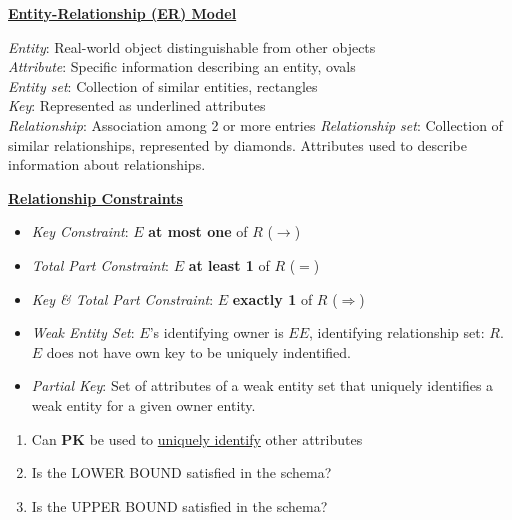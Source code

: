 \documentclass[10pt,landscape]{article}
\begin{document}
\begin{multicols*}{3}
\textbf{\underline{Entity-Relationship (ER) Model}}
\begin{scriptsize}
    \textit{Entity}: Real-world object distinguishable from other objects \\
    \textit{Attribute}: Specific information describing an entity, ovals \\
    \textit{Entity set}: Collection of similar entities, rectangles \\
    \textit{Key}: Represented as underlined attributes \\
    \textit{Relationship}: Association among 2 or more entries
    \textit{Relationship set}: Collection of similar relationships, represented by diamonds. Attributes used to describe information about relationships.
\end{scriptsize}

\textbf{\underline{Relationship Constraints}}
\begin{multicols*}{2}
    \begin{itemize}[topsep=0pt,noitemsep,wide=0pt, leftmargin=\dimexpr{} + 2\relax]
        \item \textit{Key Constraint}: $E$ \textbf{at most one} of $R$ ($\rightarrow$)
        \item \textit{Total Part Constraint}: $E$ \textbf{at least 1} of $R$ ($=$)
        \item \textit{Key \& Total Part Constraint}: $E$ \textbf{exactly 1} of $R$ ($\Rightarrow$)\\
        \item \textit{Weak Entity Set}: $E$'s identifying owner is $EE$, identifying relationship set: $R$. $E$ does not have own key to be uniquely indentified.
        \item \textit{Partial Key}: Set of attributes of a weak entity set that uniquely identifies a weak entity for a given owner entity.
    \end{itemize}
\end{multicols*}
\begin{enumerate}[topsep=0pt,noitemsep,wide=0pt, leftmargin=\dimexpr\labelwidth + 2\labelsep\relax]
    \item Can \textbf{PK} be used to \underline{uniquely identify} other attributes
    \item Is the LOWER BOUND satisfied in the schema?
    \item Is the UPPER BOUND satisfied in the schema?
\end{enumerate}


\end{multicols*}
\end{document}
